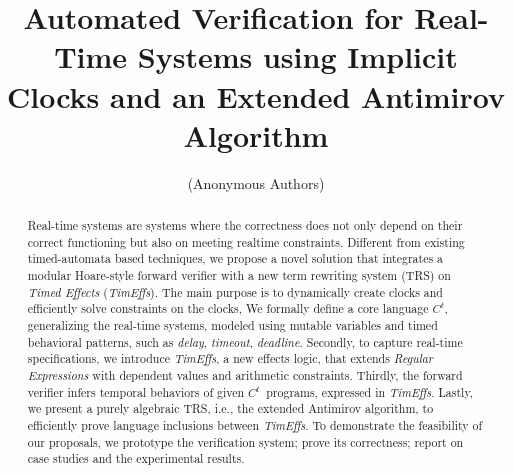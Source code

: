 \documentclass[acmsmall,10pt,review]{acmart}
\newcommand{\timedEffects}{\emph{TimEffs}}
\newcommand{\code}[1]{{\tt{\ensuremath{\m{#1}}}}}
\newcommand{\m}{\mathit}
\newcommand{\timedL}{\code{C^{t}}}
\begin{document}
\title{Automated Verification for Real-Time Systems 
using Implicit Clocks and an Extended Antimirov Algorithm}




\author{(Anonymous Authors)}






\begin{abstract} 
Real-time systems are systems where the correctness does not 
only depend on their correct functioning but also on meeting 
realtime constraints.
Different from existing timed-automata based techniques, 
we propose a novel solution that integrates a 
modular Hoare-style forward verifier with a new term rewriting 
system (TRS) on \emph{Timed Effects} (\timedEffects).
The main purpose is to dynamically create clocks  
and efficiently solve constraints on the clocks, 
We formally define 
a core language \timedL, generalizing the real-time systems, modeled 
using mutable variables and timed behavioral patterns, 
such as \emph{delay}, \emph{timeout}, \emph{deadline}. 
Secondly, to capture real-time specifications, 
we introduce \timedEffects, a new effects logic, 
that extends 
\emph{Regular Expressions} with dependent
values and arithmetic constraints.
Thirdly,  the forward verifier infers temporal behaviors of given 
\timedL\ programs, expressed in \timedEffects. 
Lastly, we present a purely algebraic TRS, i.e., the extended Antimirov algorithm, to 
efficiently prove language inclusions between 
 \timedEffects. 
To demonstrate the feasibility of our proposals, 
we prototype the verification system; prove its 
correctness; report on case studies and the experimental results. 

 



\end{abstract}
\end{document}
